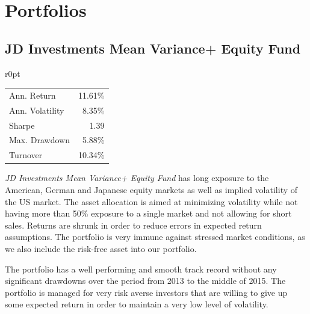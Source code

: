 \documentclass[11pt, parskip=full, DIV=14, headings=small, footsepline, footinclude=false, headsepline]{scrreprt}
\let\oldcenter\center
\let\oldendcenter\endcenter
\renewenvironment{center}{\setlength\topsep{6pt}\oldcenter}{\oldendcenter}
\begin{document}
\chapter{Portfolios}

\section{JD Investments Mean Variance+ Equity Fund}
\begin{mywraptable}{r}{0pt}
  \begin{tabular}{lr}
  \toprule
  Ann. Return & 11.61\%\\
  Ann. Volatility & 8.35\%\\
  Sharpe & 1.39\\
  Max. Drawdown& 5.88\%\\
  Turnover & 10.34\%\\
  \bottomrule
\end{tabular}
\end{mywraptable}
\textit{JD Investments Mean Variance+ Equity Fund} has long exposure to the American, German and Japanese equity markets as well as implied volatility of the US market.
The asset allocation is aimed at minimizing volatility while not having more than 50\% exposure to a single market and not allowing for short sales.
Returns are shrunk in order to reduce errors in expected return assumptions.
The portfolio is very immune against stressed market conditions, as we also include the risk-free asset into our portfolio.%
%
\begin{center}
\end{center}
%
The portfolio has a well performing and smooth track record without any significant drawdowns over the period from 2013 to the middle of 2015.
The portfolio is managed for very risk averse investors that are willing to give up some expected return in order to maintain a very low level of volatility.
\end{document}
